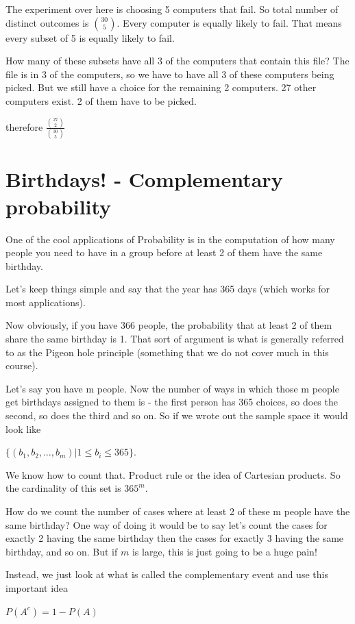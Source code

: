 \documentclass[12pt]{article}
\begin{document}
The experiment over here is choosing 5 computers that fail. So total number of distinct outcomes is ${30 \choose 5}$. Every computer is equally likely to fail. That means every subset of 5 is equally likely to fail. 

How many of these subsets have all 3 of the computers that contain this file? The file is in 3 of the computers, so we have to have all 3 of these computers being picked. But we still have a choice for the remaining 2 computers. 27 other computers exist. 2 of them have to be picked.

therefore $\frac{{27 \choose 2}}{{30 \choose 5}}$

\section*{Birthdays! - Complementary probability}

One of the cool applications of Probability is in the computation of how many people you need to have in a group before at least 2 of them have the same birthday.

Let's keep things simple and say that the year has 365 days (which works for most applications). 

Now obviously, if you have 366 people, the probability that at least 2 of them share the same birthday is 1. That sort of argument is what is generally referred to as the Pigeon hole principle (something that we do not cover much in this course).

Let's say you have m people. Now the number of ways in which those m people get birthdays assigned to them is - the first person has 365 choices, so does the second, so does the third and so on. So if we wrote out the sample space it would look like

$\{(b_1, b_2, \ldots, b_m)| 1 \le b_i \le 365 \}$.

We know how to count that. Product rule or the idea of Cartesian products. So the cardinality of this set is $365^m$.

How do we count the number of cases where at least 2 of these m people have the same birthday?
One way of doing it would be to say let's count the cases for exactly 2 having the same birthday then the cases for exactly 3 having the same birthday, and so on. But if $m$ is large, this is just going to be a huge pain!

Instead, we just look at what is called the complementary event and use this important idea

$P(A^c) = 1 - P(A)$ 
\end{document}
